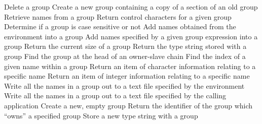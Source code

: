             {Delete a group}
            {Create a new group containing a copy of a section of an old group}
            {Retrieve names from a group}
            {Return control characters for a given group}
            {Determine if a group is case sensitive or not}
            {Add names obtained from the environment into a group}
            {Add names specified by a given group expression into a group}
            {Return the current size of a group}
            {Return the type string stored with a group}
            {Find the group at the head of an owner-slave chain}
            {Find the index of a given name within a group}
            {Return an item of character information relating to a specific name}
            {Return an item of integer information relating to a specific name}
            {Write all the names in a group out to a text file specified by the
environment}
            {Write all the names in a group out to a text file specified by the
calling application}
            {Create a new, empty group}
            {Return the identifier of the group which ``owns'' a specified
group}
            {Store a new type string with a group}
